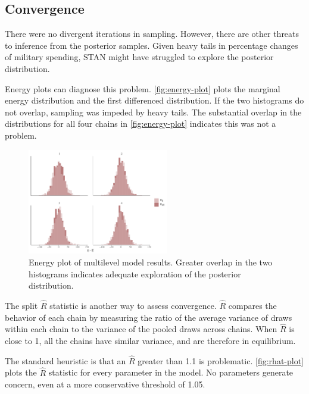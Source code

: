 \documentclass[12pt]{article}
\begin{document}
\subsection{Convergence} 


There were no divergent iterations in sampling. 
However, there are other threats to inference from the posterior samples. 
Given heavy tails in percentage changes of military spending, STAN might have struggled to explore the posterior distribution. 


Energy plots can diagnose this problem. 
\autoref{fig:energy-plot} plots the marginal energy distribution and the first differenced distribution. 
If the two histograms do not overlap, sampling was impeded by heavy tails. 
The substantial overlap in the distributions for all four chains in \autoref{fig:energy-plot} indicates this was not a problem. 


\begin{figure}
	\centering
		\includegraphics[width=0.55\textwidth]{energy-plot.pdf}
	\caption{Energy plot of multilevel model results. Greater overlap in the two histograms indicates adequate exploration of the posterior distribution. }
	\label{fig:energy-plot}
\end{figure}


The split $\hat{R}$ statistic is another way to assess convergence. 
$\hat{R}$ compares the behavior of each chain by measuring the ratio of the average variance of draws within each chain to the variance of the pooled draws across chains. 
When $\hat{R}$ is close to 1, all the chains have similar variance, and are therefore in equilibrium. 


The standard heuristic is that an $\hat{R}$ greater than 1.1 is problematic. 
\autoref{fig:rhat-plot} plots the $\hat{R}$ statistic for every parameter in the model. 
No parameters generate concern, even at a more conservative threshold of 1.05. 
\end{document}
